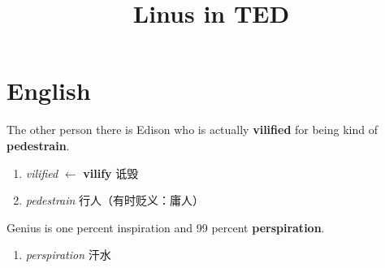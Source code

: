 \documentclass[UTF8]{ctexart}
\title{Linus in TED}
\begin{document}
    \maketitle
    \section{English}
    The other person there is Edison who is actually \textbf{vilified} for being kind of \textbf{pedestrain}.

    \begin{enumerate}
        \item \textit{vilified} $\leftarrow$ \textbf{vilify}  诋毁
        \item \textit{pedestrain}   行人（有时贬义：庸人）
    \end{enumerate}

    Genius is one percent inspiration and 99 percent \textbf{perspiration}.

    \begin{enumerate}
        \item \textit{perspiration} 汗水
    \end{enumerate}
\end{document}
